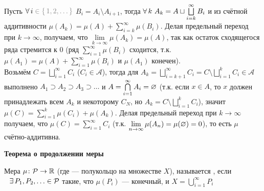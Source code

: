 \begin{prf}
	 Пусть $\A i  \uns{{}\in \{\,1, 2, \ldots\,\}}$ $B_i = A_i \setminus A_{i+1}$, тогда $\forall \, k\ A_k = A \sqcup \bigsqcup\limits_{i = k}^\infty B_i$ и из счётной аддитивности $\mu(A_k) = \mu(A) + \sum\limits_{i = k}^\infty \mu(B_i)$. Делая предельный переход при $k \to \infty$, получаем, что $\lim\limits_{k \to \infty} \mu(A_k) = \mu(A)$, так как остаток сходящегося ряда стремится к 0 (ряд $\sum\limits_{i = 1}^\infty \mu(B_i)$ сходится, т.к. $\mu(A_1) = \mu(A) + \sum\limits_{i = 1}^\infty \mu(B_i)$ и $\mu(A_1)$ конечен).\\[5pt]
	 Возьмём $C = \bigsqcup\limits_{i = 1}^\infty C_i$ ($C_i \in \mathcal{A}$), тогда для $A_k = \bigsqcup\limits_{i = k + 1}^\infty C_i = C \setminus \bigsqcup\limits_{i = 1}^k C_i \in \mathcal A$ выполнено $A_1 \supset A_2 \supset A_3 \supset \ldots$ и $A = \bigcap\limits_{i = 1}^\infty A_i = \varnothing$ (т.к. если $x \in A$, то $x$ должен принадлежать всем $A_k$ и некоторому $C_N$, но $A_k = C \setminus \bigsqcup\limits_{i = 1}^k C_i$), значит $\mu(C) = \sum\limits_{i = 1}^k \mu(C_i) + \mu(A_k)$. Делая предельный переход при $k \to \infty$ получаем, что $\mu(C) = \sum\limits_{i = 1}^\infty C_i$ (т.к. $\lim\limits_{n \to \infty} \mu(A_n) = \mu(\varnothing) = 0$), то есть $\mu$ счётно-аддитивна.
\end{prf}

\begin{center}
	\textbf{Теорема о продолжении меры}
\end{center}

\begin{opr}
	Мера $\mu \colon \mathcal{P} \to \mathbb R$ (где \p --- полукольцо на множестве $X$), называется , если$\E P_1, P_2, \ldots \in \p$ такие, что  $\mu(P_i)$ --- конечный, и $X = \bigcup\limits_{i = 1}^\infty P_i$
\end{opr}


